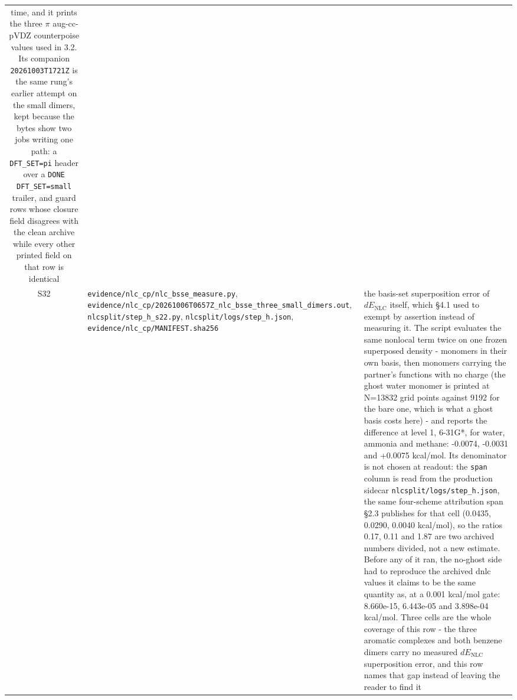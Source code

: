 \documentclass[11pt]{article}
\begin{document}
\begin{longtable}{c>{\raggedright\arraybackslash}p{}>{\raggedright\arraybackslash}p{}}
time, and it prints the three $\pi$ aug-cc-pVDZ counterpoise values used in 3.2. Its companion \texttt{20261003T1721Z} is the same rung's earlier attempt on the small dimers, kept because the bytes show two jobs writing one path: a \texttt{DFT\_SET=pi} header over a \texttt{DONE DFT\_SET=small} trailer, and guard rows whose closure field disagrees with the clean archive while every other printed field on that row is identical \\
S32 & \texttt{evidence/\allowbreak{}nlc\_\allowbreak{}cp/\allowbreak{}nlc\_\allowbreak{}bsse\_\allowbreak{}measure.py}, \texttt{evidence/\allowbreak{}nlc\_\allowbreak{}cp/\allowbreak{}20261006T0657Z\_\allowbreak{}nlc\_\allowbreak{}bsse\_\allowbreak{}three\_\allowbreak{}small\_\allowbreak{}dimers.out}, \texttt{nlcsplit/step\_h\_s22.py}, \texttt{nlcsplit/logs/step\_h.json}, \texttt{evidence/\allowbreak{}nlc\_\allowbreak{}cp/\allowbreak{}MANIFEST.sha256} & the basis-set superposition error of $dE_{\mathrm{NLC}}$ itself, which \S{}4.1 used to exempt by assertion instead of measuring it. The script evaluates the same nonlocal term twice on one frozen superposed density - monomers in their own basis, then monomers carrying the partner's functions with no charge (the ghost water monomer is printed at N=13832 grid points against 9192 for the bare one, which is what a ghost basis costs here) - and reports the difference at level 1, 6-31G*, for water, ammonia and methane: -0.0074, -0.0031 and +0.0075 kcal/mol. Its denominator is not chosen at readout: the \texttt{span} column is read from the production sidecar \texttt{nlcsplit/logs/step\_h.json}, the same four-scheme attribution span \S{}2.3 publishes for that cell (0.0435, 0.0290, 0.0040 kcal/mol), so the ratios 0.17, 0.11 and 1.87 are two archived numbers divided, not a new estimate. Before any of it ran, the no-ghost side had to reproduce the archived dnlc values it claims to be the same quantity as, at a 0.001 kcal/mol gate: 8.660e-15, 6.443e-05 and 3.898e-04 kcal/mol. Three cells are the whole coverage of this row - the three aromatic complexes and both benzene dimers carry no measured $dE_{\mathrm{NLC}}$ superposition error, and this row names that gap instead of leaving the reader to find it \\

\end{longtable}
\end{document}
